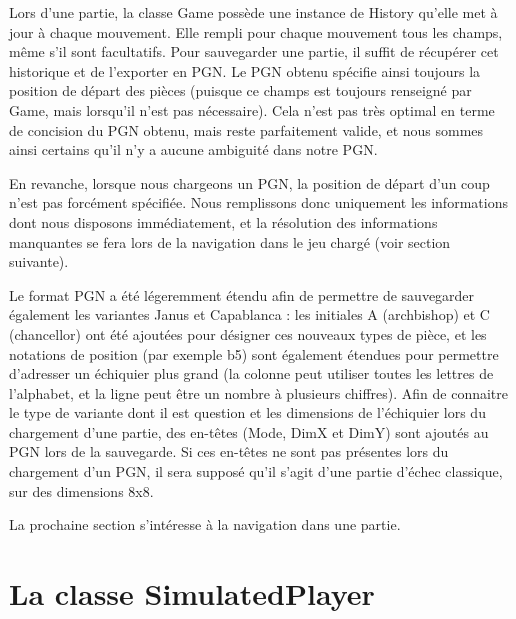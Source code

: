 \documentclass[11pt]{article}
\begin{document}
Lors d'une partie, la classe Game possède une instance de History qu'elle met à jour à chaque mouvement. Elle rempli pour chaque mouvement tous les champs, même s'il sont facultatifs. Pour sauvegarder une partie, il suffit de récupérer cet historique et de l'exporter en PGN. Le PGN obtenu spécifie ainsi toujours la position de départ des pièces (puisque ce champs est toujours renseigné par Game, mais lorsqu'il n'est pas nécessaire). Cela n'est pas très optimal en terme de concision du PGN obtenu, mais reste parfaitement valide, et nous sommes ainsi certains qu'il n'y a aucune ambiguité dans notre PGN.

En revanche, lorsque nous chargeons un PGN, la position de départ d'un coup n'est pas forcément spécifiée. Nous remplissons donc uniquement les informations dont nous disposons immédiatement, et la résolution des informations manquantes se fera lors de la navigation dans le jeu chargé (voir section suivante).\newline

Le format PGN a été légeremment étendu afin de permettre de sauvegarder également les variantes Janus et Capablanca : les initiales A (archbishop) et C (chancellor) ont été ajoutées pour désigner ces nouveaux types de pièce, et les notations de position (par exemple b5) sont également étendues pour permettre d'adresser un échiquier plus grand (la colonne peut utiliser toutes les lettres de l'alphabet, et la ligne peut être un nombre à plusieurs chiffres). Afin de connaitre le type de variante dont il est question et les dimensions de l'échiquier lors du chargement d'une partie, des en-têtes (Mode, DimX et DimY) sont ajoutés au PGN lors de la sauvegarde. Si ces en-têtes ne sont pas présentes lors du chargement d'un PGN, il sera supposé qu'il s'agit d'une partie d'échec classique, sur des dimensions 8x8.\newline

La prochaine section s'intéresse à la navigation dans une partie.

\section{La classe SimulatedPlayer}
\end{document}
